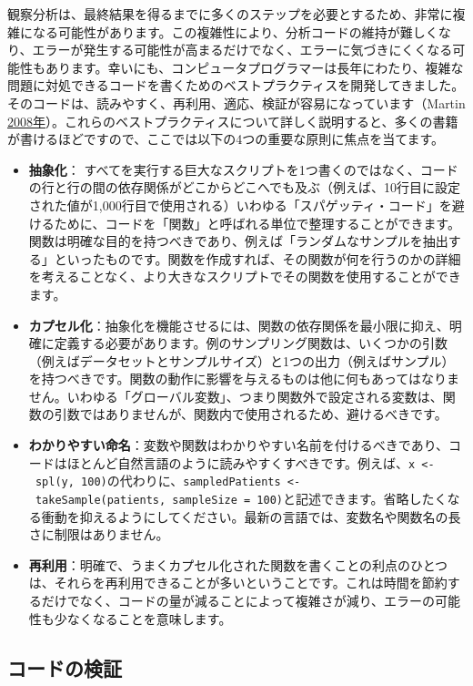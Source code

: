 \documentclass[
  11pt]{book}
\theoremstyle{definition}
\theoremstyle{definition}
\theoremstyle{definition}
\theoremstyle{definition}
\theoremstyle{remark}
\begin{document}
観察分析は、最終結果を得るまでに多くのステップを必要とするため、非常に複雑になる可能性があります。この複雑性により、分析コードの維持が難しくなり、エラーが発生する可能性が高まるだけでなく、エラーに気づきにくくなる可能性もあります。幸いにも、コンピュータプログラマーは長年にわたり、複雑な問題に対処できるコードを書くためのベストプラクティスを開発してきました。そのコードは、読みやすく、再利用、適応、検証が容易になっています（Martin \href{https://ohdsi.github.io/TheBookOfOhdsi/SoftwareValidity.html\#ref-Martin_2008}{2008年}）。これらのベストプラクティスについて詳しく説明すると、多くの書籍が書けるほどですので、ここでは以下の4つの重要な原則に焦点を当てます。

\begin{itemize}
\item
  \textbf{抽象化}： すべてを実行する巨大なスクリプトを1つ書くのではなく、コードの行と行の間の依存関係がどこからどこへでも及ぶ（例えば、10行目に設定された値が1,000行目で使用される）いわゆる「スパゲッティ・コード」を避けるために、コードを「関数」と呼ばれる単位で整理することができます。関数は明確な目的を持つべきであり、例えば「ランダムなサンプルを抽出する」といったものです。関数を作成すれば、その関数が何を行うのかの詳細を考えることなく、より大きなスクリプトでその関数を使用することができます。
\item
  \textbf{カプセル化}：抽象化を機能させるには、関数の依存関係を最小限に抑え、明確に定義する必要があります。例のサンプリング関数は、いくつかの引数（例えばデータセットとサンプルサイズ）と1つの出力（例えばサンプル）を持つべきです。関数の動作に影響を与えるものは他に何もあってはなりません。いわゆる「グローバル変数」、つまり関数外で設定される変数は、関数の引数ではありませんが、関数内で使用されるため、避けるべきです。
\item
  \textbf{わかりやすい命名}：変数や関数はわかりやすい名前を付けるべきであり、コードはほとんど自然言語のように読みやすくすべきです。例えば、\texttt{x\ \textless{}-\ spl(y,\ 100)}の代わりに、\texttt{sampledPatients\ \textless{}-\ takeSample(patients,\ sampleSize\ =\ 100)}と記述できます。省略したくなる衝動を抑えるようにしてください。最新の言語では、変数名や関数名の長さに制限はありません。
\item
  \textbf{再利用}：明確で、うまくカプセル化された関数を書くことの利点のひとつは、それらを再利用できることが多いということです。これは時間を節約するだけでなく、コードの量が減ることによって複雑さが減り、エラーの可能性も少なくなることを意味します。
\end{itemize}

\subsection{コードの検証}\label{ux30b3ux30fcux30c9ux306eux691cux8a3c}
\end{document}
